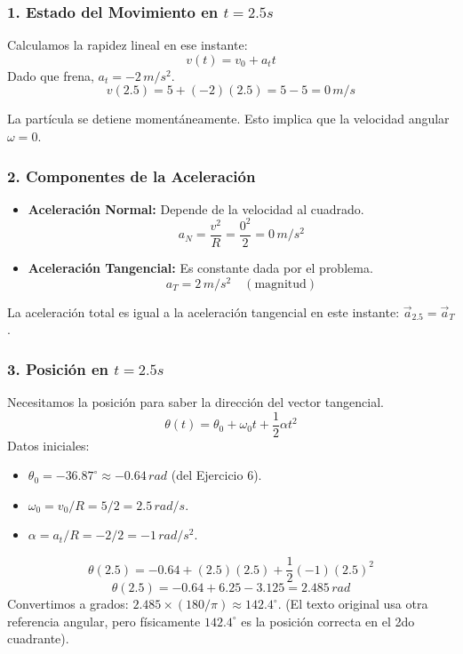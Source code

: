 \documentclass[12pt, a4paper]{article}
\begin{document}
\subsubsection*{1. Estado del Movimiento en $t=2.5s$}
Calculamos la rapidez lineal en ese instante:
$$ v(t) = v_0 + a_t t $$
Dado que frena, $a_t = -2\,\si{m/s^2}$.
$$ v(2.5) = 5 + (-2)(2.5) = 5 - 5 = 0 \, \si{m/s} $$

La partícula se detiene momentáneamente. Esto implica que la velocidad angular $\omega = 0$.

\subsubsection*{2. Componentes de la Aceleración}
\begin{itemize}
    \item \textbf{Aceleración Normal:} Depende de la velocidad al cuadrado.
    $$ a_N = \frac{v^2}{R} = \frac{0^2}{2} = 0 \, \si{m/s^2} $$
    \item \textbf{Aceleración Tangencial:} Es constante dada por el problema.
    $$ a_T = 2 \, \si{m/s^2} \quad (\text{magnitud}) $$
\end{itemize}
La aceleración total es igual a la aceleración tangencial en este instante: $\vec{a}_{2.5} = \vec{a}_T$.

\subsubsection*{3. Posición en $t=2.5s$}
Necesitamos la posición para saber la dirección del vector tangencial.
$$ \theta(t) = \theta_0 + \omega_0 t + \frac{1}{2}\alpha t^2 $$
Datos iniciales:
\begin{itemize}
    \item $\theta_0 = -36.87^\circ \approx -0.64 \, \si{rad}$ (del Ejercicio 6).
    \item $\omega_0 = v_0/R = 5/2 = 2.5 \, \si{rad/s}$.
    \item $\alpha = a_t/R = -2/2 = -1 \, \si{rad/s^2}$.
\end{itemize}

$$ \theta(2.5) = -0.64 + (2.5)(2.5) + \frac{1}{2}(-1)(2.5)^2 $$
$$ \theta(2.5) = -0.64 + 6.25 - 3.125 = 2.485 \, \si{rad} $$
Convertimos a grados: $2.485 \times (180/\pi) \approx 142.4^\circ$. (El texto original usa otra referencia angular, pero físicamente $142.4^\circ$ es la posición correcta en el 2do cuadrante).
\end{document}
